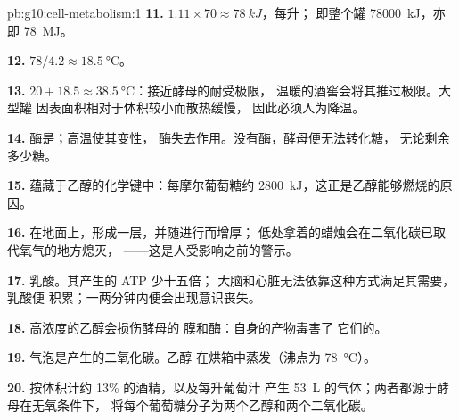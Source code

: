 \begin{solution}{pb:g10:cell-metabolism:1}
\textbf{11.} $1.11 \times 70 \approx \qty{78}{kJ}$，每升；
即整个罐 \qty{78000}{kJ}，亦即 \qty{78}{MJ}。

\textbf{12.} $78/4.2 \approx \qty{18.5}{\celsius}$。

\textbf{13.} $20 + 18.5 \approx \qty{38.5}{\celsius}$：接近酵母的耐受极限，
温暖的酒窖会将其推过极限。大型罐
因表面积相对于体积较小而散热缓慢，
因此必须人为降温。

\textbf{14.} 酶是；高温使其变性，
酶失去作用。没有酶，酵母便无法转化糖，
无论剩余多少糖。

\textbf{15.} 蕴藏于乙醇的化学键中：每摩尔葡萄糖约
\qty{2800}{kJ}，这正是乙醇能够燃烧的原因。

\textbf{16.} 在地面上，形成一层，并随进行而增厚；
低处拿着的蜡烛会在二氧化碳已取代氧气的地方熄灭，
——这是人受影响之前的警示。

\textbf{17.} 乳酸。其产生的 ATP 少十五倍；
大脑和心脏无法依靠这种方式满足其需要，乳酸便
积累；一两分钟内便会出现意识丧失。

\textbf{18.} 高浓度的乙醇会损伤酵母的
膜和酶：自身的产物毒害了
它们的。

\textbf{19.} 气泡是产生的二氧化碳。乙醇
在烘箱中蒸发（沸点为 \qty{78}{\celsius}）。

\textbf{20.} 按体积计约 13\% 的酒精，以及每升葡萄汁
产生 \qty{53}{L} 的气体；两者都源于酵母在无氧条件下，
将每个葡萄糖分子为两个乙醇和两个二氧化碳。
\end{solution}
